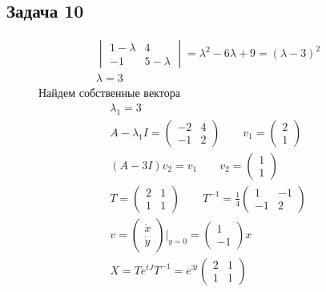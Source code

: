 \subsection*{Задача 10}
\begin{figure}[!h]
	\begin{minipage}[h]{0.49\linewidth}
		\begin{gather*}
			\begin{vmatrix}
				1 - \lambda & 4\\
				-1 & 5 - \lambda
			\end{vmatrix}
			=
			\lambda^2 - 6\lambda + 9
			=
			\left(\lambda - 3\right)^2\\
			\lambda = 3
		\end{gather*}
		Найдем собственные вектора
		\begin{gather*}
			\lambda_1 = 3\\
			A - \lambda_1 I =
			\begin{pmatrix}
				-2 & 4\\
				-1 & 2
			\end{pmatrix}\qquad
			v_1 =
			\begin{pmatrix}
				2 \\ 1
			\end{pmatrix}\\
			\left(A - 3I\right)v_2 = v_1\qquad
			v_2 = 
			\begin{pmatrix}
				1 \\ 1
			\end{pmatrix}\\
			T = 
			\begin{pmatrix}
				2 & 1 \\ 1 & 1
			\end{pmatrix}\qquad
			T^{-1} = \frac{1}{4}
			\begin{pmatrix}
				1 & -1 \\ -1 & 2
			\end{pmatrix}\\
			v =
			\begin{pmatrix}
				\dot{x} \\ \dot{y}
			\end{pmatrix}
			|_{y = 0}
			=
			\begin{pmatrix}
				1 \\ -1
			\end{pmatrix}x\\
			X = T e^{tJ} T^{-1} = e^{3t}
			\begin{pmatrix}
				2 & 1\\
				1 & 1
			\end{pmatrix}

\end{gather*}
\end{minipage}
\end{figure}
